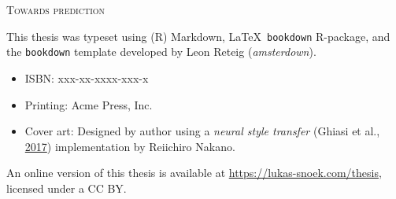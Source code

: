 \documentclass[11pt,american,a4paper,oneside,]{memoir} %
\newcommand{\CoverName}{cover} %
\begin{document}

\setlength{\abstitleskip}{-\absparindent}

\pagestyle{empty}
\renewcommand{\thepage}{\CoverName} %


\frontmatter
\thispagestyle{empty}
\def\drop{.1\textheight}

\vspace*{\drop}
\begin{center}
\Huge \textsc{Towards prediction}
\end{center}

\clearpage
\thispagestyle{empty}
\vspace*{\fill}
\begingroup %
\small
\setlength{\parskip}{\baselineskip} %
\setlength\parindent{0pt} %

This thesis was typeset using (R) Markdown, \LaTeX\, \verb+bookdown+ R-package, and the \verb+bookdown+ template developed by Leon Reteig (\textit{amsterdown}).

\begin{itemize}[label={}, itemsep=0pt, partopsep=3pt, topsep=-\parskip, parsep=0pt, leftmargin=1em]
  \item ISBN: xxx-xx-xxxx-xxx-x 
  \item Printing: Acme Press, Inc. 
  \item Cover art: Designed by author using a \emph{neural style transfer} (Ghiasi et al., \protect\hyperlink{ref-ghiasi2017exploring}{2017}) implementation by Reiichiro Nakano. 
\end{itemize}

\noindent An online version of this thesis is available at \url{https://lukas-snoek.com/thesis}, licensed under a CC BY.
\endgroup
\end{document}
